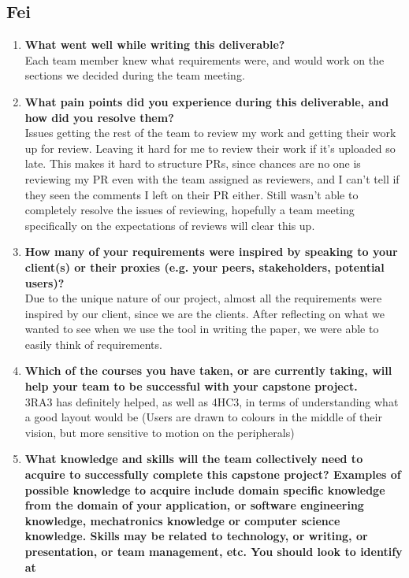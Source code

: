 \subsection*{Fei}
\begin{enumerate}
  \item \textbf{What went well while writing this deliverable?} \\
  Each team member knew what requirements were, and would work on the sections we decided during the team meeting.
  \item \textbf{What pain points did you experience during this deliverable, and how did
  you resolve them?} \\
  Issues getting the rest of the team to review my work and getting their work up for review. Leaving it hard for me to review their work if it's uploaded so late. This makes it hard to structure PRs, since chances are no one is reviewing my PR even with the team assigned as reviewers, and I can't tell if they seen the comments I left on their PR either. Still wasn't able to completely resolve the issues of reviewing, hopefully a team meeting specifically on the expectations of reviews will clear this up.
  \item \textbf{How many of your requirements were inspired by speaking to your client(s) or their proxies (e.g. your peers, stakeholders, potential users)?} \\
  Due to the unique nature of our project, almost all the requirements were inspired by our client, since we are the clients. After reflecting on what we wanted to see when we use the tool in writing the paper, we were able to easily think of requirements.
  \item \textbf{Which of the courses you have taken, or are currently taking, will help your team to be successful with your capstone project.} \\
  3RA3 has definitely helped, as well as 4HC3, in terms of understanding what a good layout would be (Users are drawn to colours in the middle of their vision, but more sensitive to motion on the peripherals)
  \item \textbf{What knowledge and skills will the team collectively need to acquire to
  successfully complete this capstone project?  Examples of possible knowledge
  to acquire include domain specific knowledge from the domain of your
  application, or software engineering knowledge, mechatronics knowledge or
  computer science knowledge.  Skills may be related to technology, or writing,
  or presentation, or team management, etc.  You should look to identify at
}
\end{enumerate}

